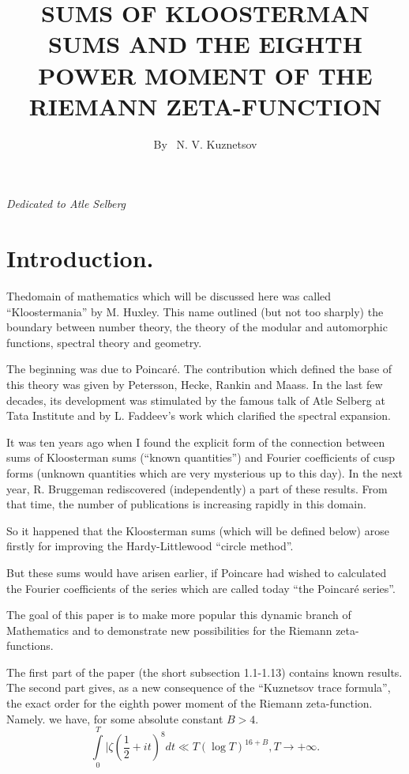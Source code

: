 
\title{SUMS OF KLOOSTERMAN SUMS AND THE EIGHTH POWER MOMENT OF THE RIEMANN ZETA-FUNCTION}

\author{By~ N. V. Kuznetsov}

\date{}
\maketitle

\setcounter{pageoriginal}{56} 

\hfill \textit{Dedicated to Atle Selberg}

\setcounter{section}{-1}
\section{Introduction.} The\pageoriginale domain of mathematics which will be discussed here was called ``Kloostermania'' by M. Huxley. This name outlined (but not too sharply) the boundary between number theory, the theory of the modular and automorphic functions, spectral theory and geometry.

The beginning was due to Poincar\'e. The contribution which defined the base of this theory was given by Petersson, Hecke, Rankin and Maass. In the last few decades, its development was stimulated by the famous talk of Atle Selberg at Tata Institute and by  L. Faddeev's work which clarified the spectral expansion.

It was ten years ago when I found the explicit form of the connection between sums of Kloosterman sums (``known quantities'') and Fourier coefficients of cusp forms (unknown quantities which are very mysterious up to this day). In the next year, R. Bruggeman rediscovered (independently) a part of these results. From that time, the number of publications is increasing rapidly in this domain. 

So it happened that the Kloosterman sums (which will be defined below) arose firstly for improving the Hardy-Littlewood ``circle method''. 

But these sums would have arisen earlier, if Poincare had wished to calculated the Fourier coefficients of the series which are called today ``the Poincar\'e series''.

The goal of this paper is to make more popular this dynamic branch of Mathematics and to demonstrate new possibilities for the Riemann zeta-functions.

The first part of the paper (the short subsection 1.1-1.13) contains known results. The second part gives, as a new consequence of the ``Kuznetsov trace formula'', the exact order for the eighth power moment of the Riemann zeta-function. Namely. we have, for some absolute constant $B > 4$.
$$
\int\limits^T_0 |\zeta (\frac{1}{2} + it)^8 dt \ll T (\log T)^{16+B} , T \to + \infty.
$$

